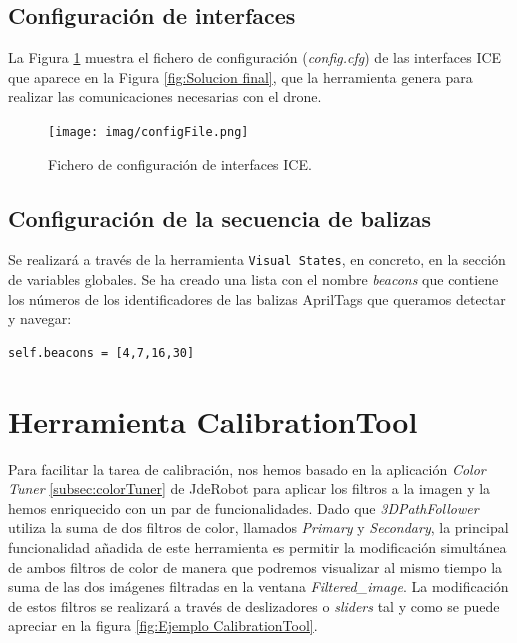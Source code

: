 \subsection{Configuración de interfaces}

La Figura \ref{fig:Config File} muestra el fichero de configuración (\textit{config.cfg}) de las interfaces ICE que aparece en la Figura \ref{fig:Solucion final}, que la herramienta genera para realizar las comunicaciones necesarias con el drone.

\begin{figure}[H]
	\begin{center}
		\texttt{[image: imag/configFile.png]}
		\caption{Fichero de configuración de interfaces ICE.}
		\label{fig:Config File}	
	\end{center}
\end{figure}

\subsection{Configuración de la secuencia de balizas}

Se realizará a través de la herramienta \texttt{Visual States}, en concreto, en la sección de variables globales. Se ha creado una lista con el nombre \textit{beacons} que contiene los números de los identificadores de las balizas AprilTags que queramos detectar y navegar:

\begin{lstlisting}[backgroundcolor=\color{gray!15}]
self.beacons = [4,7,16,30]
\end{lstlisting}

\section{Herramienta CalibrationTool} \label{sec:calibrationtool}

Para facilitar la tarea de calibración, nos hemos basado en la aplicación \textit{Color Tuner} \ref{subsec:colorTuner} de JdeRobot para aplicar los filtros a la imagen y la hemos enriquecido con un par de funcionalidades. Dado que \textit{3DPathFollower} utiliza la suma de dos filtros de color, llamados \textit{Primary} y \textit{Secondary}, la principal funcionalidad añadida de este herramienta es permitir la modificación simultánea de ambos filtros de color de manera que podremos visualizar al mismo tiempo la suma de las dos imágenes filtradas en la ventana \textit{Filtered\_image}. La modificación de estos filtros se realizará a través de deslizadores o \textit{sliders} tal y como se puede apreciar en la figura \ref{fig:Ejemplo CalibrationTool}.

